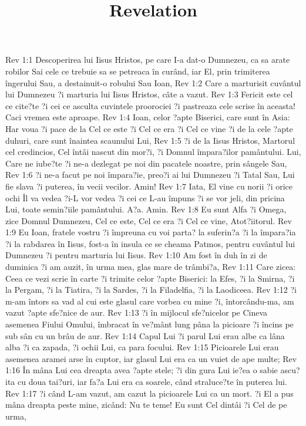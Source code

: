 

\title{Revelation}

Rev 1:1  Descoperirea lui Iisus Hristos, pe care I-a dat-o Dumnezeu, ca sa arate robilor Sai cele ce trebuie sa se petreaca în curând, iar El, prin trimiterea îngerului Sau, a destainuit-o robului Sau Ioan,
Rev 1:2  Care a marturisit cuvântul lui Dumnezeu ?i marturia lui Iisus Hristos, câte a vazut.
Rev 1:3  Fericit este cel ce cite?te ?i cei ce asculta cuvintele proorociei ?i pastreaza cele scrise în aceasta! Caci vremea este aproape.
Rev 1:4  Ioan, celor ?apte Biserici, care sunt în Asia: Har voua ?i pace de la Cel ce este ?i Cel ce era ?i Cel ce vine ?i de la cele ?apte duhuri, care sunt înaintea scaunului Lui,
Rev 1:5  ?i de la Iisus Hristos, Martorul cel credincios, Cel întâi nascut din mor?i, ?i Domnul împara?ilor pamântului. Lui, Care ne iube?te ?i ne-a dezlegat pe noi din pacatele noastre, prin sângele Sau,
Rev 1:6  ?i ne-a facut pe noi împara?ie, preo?i ai lui Dumnezeu ?i Tatal Sau, Lui fie slava ?i puterea, în vecii vecilor. Amin!
Rev 1:7  Iata, El vine cu norii ?i orice ochi Îl va vedea ?i-L vor vedea ?i cei ce L-au împuns ?i se vor jeli, din pricina Lui, toate semin?iile pamântului. A?a. Amin.
Rev 1:8  Eu sunt Alfa ?i Omega, zice Domnul Dumnezeu, Cel ce este, Cel ce era ?i Cel ce vine, Atot?iitorul.
Rev 1:9  Eu Ioan, fratele vostru ?i împreuna cu voi parta? la suferin?a ?i la împara?ia ?i la rabdarea în Iisus, fost-a în insula ce se cheama Patmos, pentru cuvântul lui Dumnezeu ?i pentru marturia lui Iisus.
Rev 1:10  Am fost în duh în zi de duminica ?i am auzit, în urma mea, glas mare de trâmbi?a,
Rev 1:11  Care zicea: Ceea ce vezi scrie în carte ?i trimite celor ?apte Biserici: la Efes, ?i la Smirna, ?i la Pergam, ?i la Tiatira, ?i la Sardes, ?i la Filadelfia, ?i la Laodiceea.
Rev 1:12  ?i m-am întors sa vad al cui este glasul care vorbea cu mine ?i, întorcându-ma, am vazut ?apte sfe?nice de aur.
Rev 1:13  ?i în mijlocul sfe?nicelor pe Cineva asemenea Fiului Omului, îmbracat în ve?mânt lung pâna la picioare ?i încins pe sub sân cu un brâu de aur.
Rev 1:14  Capul Lui ?i parul Lui erau albe ca lâna alba ?i ca zapada, ?i ochii Lui, ca para focului.
Rev 1:15  Picioarele Lui erau asemenea aramei arse în cuptor, iar glasul Lui era ca un vuiet de ape multe;
Rev 1:16  În mâna Lui cea dreapta avea ?apte stele; ?i din gura Lui ie?ea o sabie ascu?ita cu doua tai?uri, iar fa?a Lui era ca soarele, când straluce?te în puterea lui.
Rev 1:17  ?i când L-am vazut, am cazut la picioarele Lui ca un mort. ?i El a pus mâna dreapta peste mine, zicând: Nu te teme! Eu sunt Cel dintâi ?i Cel de pe urma,
